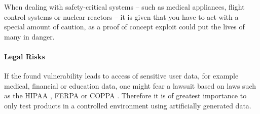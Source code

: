 When dealing with safety-critical systems -- such as medical appliances, flight control systems or nuclear reactors -- it is given that you have to act with a special amount of caution, as a proof of concept exploit could put the lives of many in danger.

\paragraph{Legal Risks}

If the found vulnerability leads to access of sensitive user data, for example medical, financial or education data, one might fear a lawsuit based on laws such as the HIPAA \cite{law:HIPAA}, FERPA \cite{law:FERPA} or COPPA \cite{law:COPPA}. Therefore it is of greatest importance to only test products in a controlled environment using artificially generated data.


